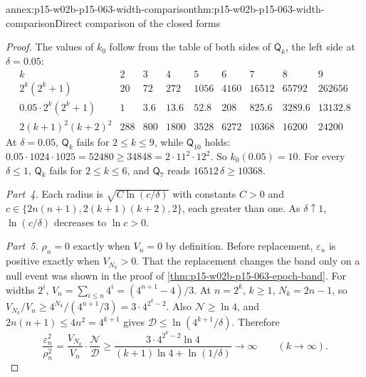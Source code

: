 \begin{annexitem}{annex:p15-w02b-p15-063-width-comparison}{thm:p15-w02b-p15-063-width-comparison}{Direct comparison of the closed forms}
\begin{proof}
The values of \(k_0\) follow from the table of both sides of
\(\mathsf Q_k\), the left side at \(\delta=0.05\):
\[
\begin{array}{r|cccccccc}
 k&2&3&4&5&6&7&8&9\\ \hline
 2^k(2^k+1)&20&72&272&1056&4160&16512&65792&262656\\
 0.05\cdot2^k(2^k+1)&1&3.6&13.6&52.8&208&825.6&3289.6&13132.8\\
 2(k+1)^2(k+2)^2&288&800&1800&3528&6272&10368&16200&24200
\end{array}
\]
At \(\delta=0.05\), \(\mathsf Q_k\) fails for \(2\leq k\leq9\), while
\(\mathsf Q_{10}\) holds: \(0.05\cdot1024\cdot1025=52480\geq34848=
2\cdot11^2\cdot12^2\). So \(k_0(0.05)=10\). For every \(\delta\leq1\),
\(\mathsf Q_k\) fails for \(2\leq k\leq6\), and \(\mathsf Q_7\) reads
\(16512\,\delta\geq10368\).

\emph{Part~4.} Each radius is \(\sqrt{C\ln(c/\delta)}\) with constants
\(C>0\) and \(c\in\{2n(n+1),2(k+1)(k+2),2\}\), each greater than one. As
\(\delta\uparrow1\), \(\ln(c/\delta)\) decreases to \(\ln c>0\).

\emph{Part~5.} \(\rho_n=0\) exactly when \(V_n=0\) by definition. Before
replacement, \(\varepsilon_n\) is positive exactly when \(V_{N_k}>0\).
That the replacement changes the band only on a null event was shown in
the proof of \cref{thm:p15-w02b-p15-063-epoch-band}. For widths
\(2^i\), \(V_n=\sum_{i\leq n}4^i=(4^{n+1}-4)/3\). At \(n=2^k\),
\(k\geq1\), \(N_k=2n-1\), so
\(V_{N_k}/V_n\geq4^{N_k}/(4^{n+1}/3)=3\cdot4^{2^k-2}\). Also
\(\mathcal N\geq\ln4\), and \(2n(n+1)\leq4n^2=4^{k+1}\) gives
\(\mathcal D\leq\ln(4^{k+1}/\delta)\). Therefore
\[
 \frac{\varepsilon_n^2}{\rho_n^2}
   =\frac{V_{N_k}}{V_n}\cdot\frac{\mathcal N}{\mathcal D}
   \geq\frac{3\cdot4^{2^k-2}\ln4}{(k+1)\ln4+\ln(1/\delta)}
   \longrightarrow\infty\qquad(k\to\infty).
\]
\end{proof}
\end{annexitem}
